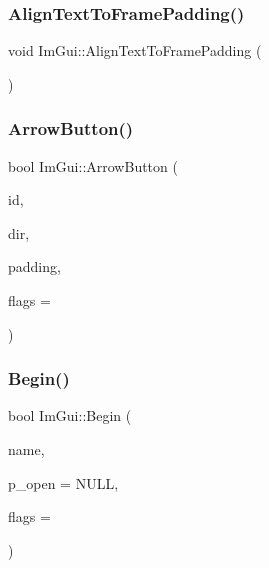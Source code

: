 \subsubsection{\texorpdfstring{Align\+Text\+To\+Frame\+Padding()}{AlignTextToFramePadding()}}
{\footnotesize\ttfamily void Im\+Gui\+::\+Align\+Text\+To\+Frame\+Padding (\begin{DoxyParamCaption}{ }\end{DoxyParamCaption})}

\hypertarget{namespace_im_gui_ac7c2bd67d2bb2d8ee4b583b1576a0bd3}{}\label{namespace_im_gui_ac7c2bd67d2bb2d8ee4b583b1576a0bd3} 
\subsubsection{\texorpdfstring{Arrow\+Button()}{ArrowButton()}}
{\footnotesize\ttfamily bool Im\+Gui\+::\+Arrow\+Button (\begin{DoxyParamCaption}\item[{Im\+Gui\+ID}]{id,  }\item[{Im\+Gui\+Dir}]{dir,  }\item[{\hyperlink{struct_im_vec2}{Im\+Vec2}}]{padding,  }\item[{Im\+Gui\+Button\+Flags}]{flags = {} }\end{DoxyParamCaption})}

\hypertarget{namespace_im_gui_a581e58db0bc930bafa4a5d23093a2b99}{}\label{namespace_im_gui_a581e58db0bc930bafa4a5d23093a2b99} 
\subsubsection{\texorpdfstring{Begin()}{Begin()}\hspace{0.1cm}{\footnotesize\ttfamily [1/2]}}
{\footnotesize\ttfamily bool Im\+Gui\+::\+Begin (\begin{DoxyParamCaption}\item[{const char $\ast$}]{name,  }\item[{bool $\ast$}]{p\+\_\+open = {\ttfamily NULL},  }\item[{Im\+Gui\+Window\+Flags}]{flags = {} }\end{DoxyParamCaption})}

\hypertarget{namespace_im_gui_a288e01ff1c8102d6374a6b1e409b9878}{}\label{namespace_im_gui_a288e01ff1c8102d6374a6b1e409b9878} 
